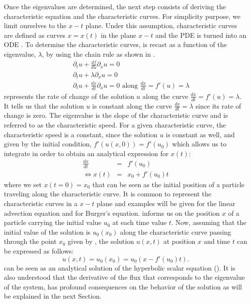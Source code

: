 Once the eigenvalues are determined, the next step consists of deriving the characteristic equation and the characteristic curves. For simplicity purpose, we limit ourselves to the $x-t$ plane. Under this assumption, characteristic curves are defined as curves $x = x(t)$ in the plane $x-t$ and the PDE is turned into an ODE \cite{Toro}. To determine the characteristic curves,  is recast as a function of the eigenvalue, $\lambda$, by using the chain rule as shown in .
%
\begin{eqnarray}\label{eq:ivp3_sct1b}
&&\partial_t u + \frac{df}{du}\partial_x u = 0 \nonumber\\
&&\partial_t u + \lambda \partial_x u = 0 \nonumber \\
&&\partial_t u + \frac{dx}{dt} \partial_x u = 0 \text{ along } \frac{dx}{dt} = f'(u) = \lambda 
\end{eqnarray}
%
 represents the rate of change of the solution $u$ along the curve $\frac{dx}{dt} = f'(u) = \lambda$. It tells us that the solution $u$ is constant along the curve $\frac{dx}{dt} = \lambda$ since its rate of change is zero. The eigenvalue is the slope of the characteristic curve and is referred to as the characteristic speed. 
For a given characteristic curve, the characteristic speed is a constant, since the solution $u$ is constant as well, and given by the initial condition, $f'(u(x,0))=f'(u_0)$ which allows us to integrate in order to obtain an analytical expression for $x(t)$:
%
\begin{eqnarray}\label{eq:ivp4_sct1b}
\frac{dx}{dt} &=& f'(u_0) \nonumber \\
\Leftrightarrow x(t) &=& x_0 + f'(u_0)t
\end{eqnarray}
%
where we set $x(t=0) = x_0$ that can be seen as the initial position of a particle traveling along the characteristic curve. It is common to represent the characteristic curves in a $x-t$ plane and examples will be given for the linear advection equation and for Burger's equation.  informs us on the position $x$ of a particle carrying the initial value $u_0$ at each time value $t$. Now, assuming that the initial value of the solution is $u_0(x_0)$ along the characteristic curve passing through the point $x_0$ given by , the solution $u(x,t)$ at position $x$ and time $t$ can be expressed as follows:
%
\begin{equation}\label{eq:ivp5_sct1b}
u(x,t) = u_0(x_0) = u_0(x - f'(u_0)t) .
\end{equation}
%
 can be seen as an analytical solution of the hyperbolic scalar equation (). It is also understood that the derivative of the flux that corresponds to the eigenvalue of the system, has profound consequences on the behavior of the solution as will be explained in the next Section. %

